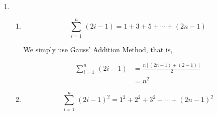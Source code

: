\documentclass[11pt]{amsart}
\begin{document}
\begin{enumerate}[label=\arabic*.]
	\item
		\begin{enumerate}[label=(\roman*)]
			\item
				\[
					\sum_{i=1}^{n} \, (2i-1) = 1 + 3 + 5 + \cdots + (2n-1)
				\]

				\bigskip

				We simply use Gauss' Addition Method, that is, 

				\begin{align*}
					\sum_{i=1}^{n} \, (2i-1) &= \frac{n\left[ (2n-1) + (2-1)\right]}{2} \\
								 &= n^2
				\end{align*}
			\item
				\[
					\sum_{i=1}^{n}\,(2i-1)^2 = 1^2 + 2^2 + 3^2 + \cdots + (2n-1)^2
				\]

		\end{enumerate}
\end{enumerate}
\end{document}
